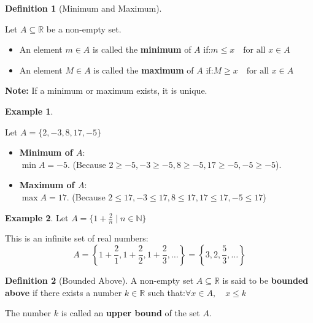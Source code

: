 \documentclass[
]{book}
\theoremstyle{definition}
\newtheorem{definition}{Definition}[chapter]
\theoremstyle{definition}
\newtheorem{example}{Example}[chapter]
\theoremstyle{definition}
\theoremstyle{definition}
\theoremstyle{remark}
\begin{document}
\begin{definition}[Minimum and Maximum]
\protect\hypertarget{def:unnamed-chunk-104}{}\label{def:unnamed-chunk-104}

Let \(A \subseteq \mathbb{R}\) be a non-empty set.

\begin{itemize}
\item
  An element \(m \in A\) is called the \textbf{minimum} of \(A\) if:\(m \leq x \quad \text{for all } x \in A\)
\item
  An element \(M \in A\) is called the \textbf{maximum} of \(A\) if:\(M \geq x \quad \text{for all } x \in A\)
\end{itemize}

\end{definition}

\textbf{Note:} If a minimum or maximum exists, it is unique.

\begin{example}
\protect\hypertarget{exm:unnamed-chunk-105}{}\label{exm:unnamed-chunk-105}

Let \(A = \{2, -3, 8, 17, -5\}\)

\begin{itemize}
\item
  \textbf{Minimum of \(A\)}:\\
  \(\min A = -5\). (Because \(2 \geq -5,
  -3\geq -5,
  8 \geq -5,
  17\geq -5,
  -5 \geq -5\)).
\item
  \textbf{Maximum of \(A\)}:\\
  \(\max A = 17\). (Because \(2 \leq 17,
  -3\leq 17,
  8 \leq 17,
  17\leq 17,
  -5 \leq 17\))
\end{itemize}

\end{example}

\begin{example}
\protect\hypertarget{exm:unnamed-chunk-106}{}\label{exm:unnamed-chunk-106}Let \(A = \{1 + \frac{2}{n} \mid n \in \mathbb{N} \}\)

This is an infinite set of real numbers:
\[
A = \left\{1 + \frac{2}{1}, 1 + \frac{2}{2}, 1 + \frac{2}{3}, \dots \right\} = \left\{3, 2, \frac{5}{3}, \dots \right\}
\]
\end{example}

\begin{definition}[Bounded Above]
\protect\hypertarget{def:unnamed-chunk-107}{}\label{def:unnamed-chunk-107}A non-empty set \(A \subseteq \mathbb{R}\) is said to be \textbf{bounded above} if there exists a number \(k \in \mathbb{R}\) such that:\(\forall x \in A, \quad x \leq k\)

The number \(k\) is called an \textbf{upper bound} of the set \(A\).
\end{definition}
\end{document}
